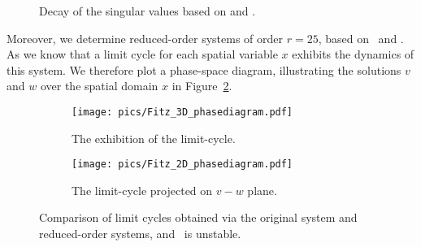 \begin{figure}[h]
\centering
\begin{center}
\end{center}
	\setlength\fheight{3cm}
	\setlength\fwidth{6cm}
	
		\caption{Decay of the singular values based on {\GramQB} and {\GramB}.}
		\label{fig:Fitz_singular}
\end{figure}

Moreover, we determine reduced-order systems of order $r = 25$, based on  \GramQB~and \GramB. As we know that a limit cycle for each spatial variable $x$ exhibits the dynamics of this system. We therefore plot a phase-space diagram, illustrating the solutions $v$ and $w$ over the spatial domain $x$ in Figure~\ref{fig:fitz_limit}.
\begin{figure}[H]
        \centering
        \begin{center}
\end{center}
 \begin{subfigure}[t]{0.58\textwidth}
  \centering
		\texttt{[image: pics/Fitz\_3D\_phasediagram.pdf]}
		{\caption{The exhibition of the limit-cycle.}}
 \end{subfigure}
 \begin{subfigure}[t]{0.38\textwidth}
  \centering
		\texttt{[image: pics/Fitz\_2D\_phasediagram.pdf]}
		\caption{The limit-cycle projected on $v-w$ plane.}
 \end{subfigure}
 \caption{Comparison of  limit cycles obtained via the original system and reduced-order systems, and \redBbal~is unstable.}
 \label{fig:fitz_limit}
\end{figure}


